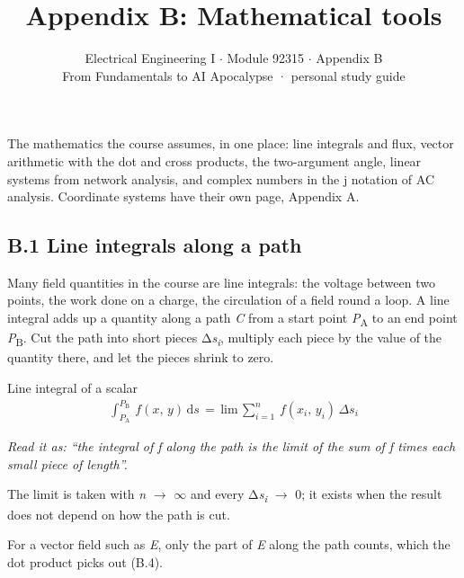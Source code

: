 \documentclass[11pt]{article}
\title{\sffamily\bfseries\color{FAUblue}Appendix B: Mathematical tools}
\author{Electrical Engineering I \ensuremath{\cdot} Module 92315 \ensuremath{\cdot} Appendix B\\[2pt]\small From Fundamentals to AI Apocalypse · personal study guide}
\date{}
\begin{document}
\maketitle
\begingroup\footnotesize\setlength{\parskip}{0pt}\tableofcontents\endgroup
\clearpage

{\large The mathematics the course assumes, in one place: line integrals and flux, vector arithmetic with the dot and cross products, the two-argument angle, linear systems from network analysis, and complex numbers in the j notation of AC analysis. Coordinate systems have their own page, Appendix A.}


\begin{keepsection}
\section{B.1 Line integrals along a path}

Many field quantities in the course are line integrals: the voltage between two points, the work done on a charge, the circulation of a field round a loop. A line integral adds up a quantity along a path \textit{C} from a start point \textit{P}\textsubscript{A} to an end point \textit{P}\textsubscript{B}. Cut the path into short pieces Δ\textit{s}\textsubscript{\textit{i}}, multiply each piece by the value of the quantity there, and let the pieces shrink to zero.

\begin{equationcard}{Line integral of a scalar}
\[ \begin{gathered} \int_{{P}_{\mathrm{A}}}^{{P}_{\mathrm{B}}} \, {f}({x},\, {y})\, \mathrm{d}{s}\, =\, \text{lim}\, \sum_{{i}=1}^{{n}} \, {f}({x}_{{i}},\, {y}_{{i}})\, Δ{s}_{{i}} \end{gathered} \]
{\small \emph{Read it as: “the integral of f along the path is the limit of the sum of f times each small piece of length”.}\par The limit is taken with \textit{n} \ensuremath{\to} \ensuremath{\infty} and every Δ\textit{s}\textsubscript{\textit{i}} \ensuremath{\to} 0; it exists when the result does not depend on how the path is cut.}
\end{equationcard}

For a vector field such as \textit{E}, only the part of \textit{E} along the path counts, which the dot product picks out (B.4).


\end{keepsection}
\end{document}
